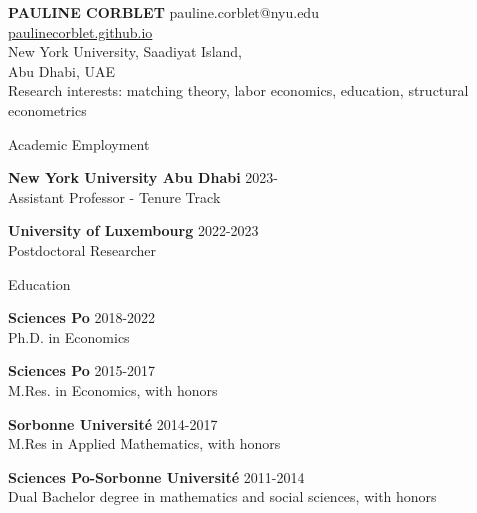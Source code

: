 \documentclass{resume} %
\begin{document}
{\bf \large PAULINE CORBLET} \hfill pauline.corblet@nyu.edu\\
{\phantom{smth}} \hfill \href{https://paulinecorblet.github.io}{paulinecorblet.github.io} \\
New York University, Saadiyat Island, \\ 
Abu Dhabi, UAE \\

{\large Research interests: matching theory, labor economics, education, structural econometrics}


\begin{rSection}{Academic Employment}

{\bf New York University Abu Dhabi} \hfill {2023-} \\
  Assistant Professor - Tenure Track

{\bf University of Luxembourg} \hfill {2022-2023} \\
Postdoctoral Researcher

\end{rSection}

\begin{rSection}{Education}

{\bf Sciences Po} \hfill {2018-2022}
\\ Ph.D. in Economics

{\bf Sciences Po} \hfill {2015-2017}
\\ M.Res. in Economics, with honors

{\bf Sorbonne Université} \hfill {2014-2017}
\\ M.Res in Applied Mathematics, with honors

{\bf Sciences Po-Sorbonne Université} \hfill {2011-2014}
\\ Dual Bachelor degree in mathematics and social sciences, with honors


\end{rSection}
%
%
%
\end{document}
